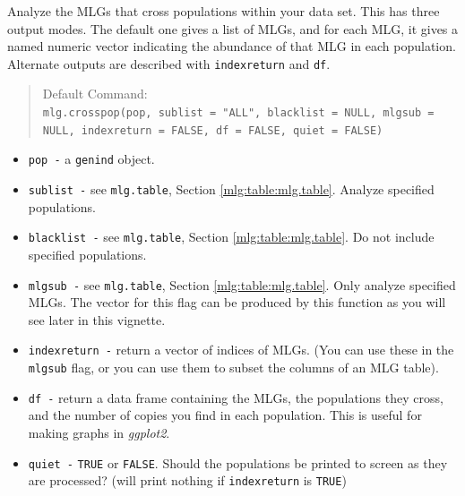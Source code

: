 \documentclass[letterpaper]{article}
\newcommand{\tab}{\hspace*{1em}}
\begin{document}
\tab\tab Analyze the MLGs that cross populations within your data set. This has three output modes. The default one gives a list of MLGs, and for each MLG, it gives a named numeric vector indicating the abundance of that MLG in each population. Alternate outputs are described with \texttt{indexreturn} and \texttt{df}.
\begin{quote}
Default Command:\\
\texttt{mlg.crosspop(pop, sublist = "ALL", blacklist = NULL, mlgsub = NULL, indexreturn = FALSE, df = FALSE, quiet = FALSE)}
\end{quote}
  \begin{itemize}
    \item \texttt{pop -} a \texttt{genind} object.
    \item \texttt{sublist -} see \texttt{mlg.table}, Section \ref{mlg:table:mlg.table}. Analyze specified populations.
    \item \texttt{blacklist -} see \texttt{mlg.table}, Section \ref{mlg:table:mlg.table}. Do not include specified populations.
    \item \texttt{mlgsub -} see \texttt{mlg.table}, Section \ref{mlg:table:mlg.table}. Only analyze specified MLGs. The vector for this flag can be produced by this function as you will see later in this vignette.
    \item \texttt{indexreturn -} return a vector of indices of MLGs. (You can use these in the \texttt{mlgsub} flag, or you can use them to subset the columns of an MLG table). 
    \item \texttt{df -} return a data frame containing the MLGs, the populations they cross, and the number of copies you find in each population. This is useful for making graphs in \textit{ggplot2}.
    \item \texttt{quiet -} \texttt{TRUE} or \texttt{FALSE}. Should the populations be printed to screen as they are processed? (will print nothing if \texttt{indexreturn} is \texttt{TRUE})
  \end{itemize}
  
\end{document}
